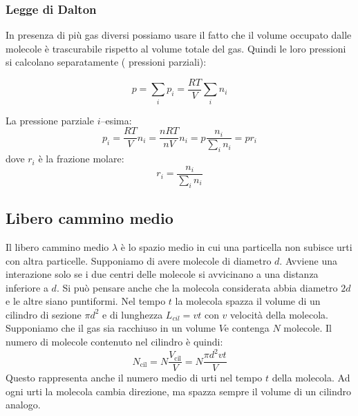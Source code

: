 \subsubsection{Legge di Dalton}
In presenza di più gas diversi possiamo usare il fatto che il volume occupato dalle molecole è trascurabile rispetto al volume totale del gas. Quindi le loro pressioni si calcolano separatamente ( pressioni parziali):
\begin{legge}[Dalton]
   \begin{equation}
      p = \sum_i p_i = \frac{RT}{V}\sum_i{n_i}
   \end{equation}
\end{legge}
La pressione parziale $i$--esima:
\begin{equation}
   p_i = \frac{RT}{V}n_i = \frac{nRT}{nV}n_i = p\frac{n_i}{\sum_i n_i} = pr_i
\end{equation}
dove $r_i$ è la frazione molare:
\begin{equation}
   r_i = \frac{n_i}{\sum_i n_i}
\end{equation}


\subsection{Libero cammino medio}
\label{libero cammino medio fisica1}
Il libero cammino medio $\lambda$ è lo spazio medio in cui una particella non subisce urti con altra particelle. Supponiamo di avere molecole di diametro $d$. Avviene una interazione solo se i due centri delle molecole si avvicinano a una distanza inferiore a $d$. Si può pensare anche che la molecola considerata abbia diametro $2d$ e le altre siano puntiformi. Nel tempo $t$ la molecola spazza il volume di un cilindro di sezione $\pi d^2$ e di lunghezza $L_{cil}=vt$ con $v$ velocità della molecola. Supponiamo che il gas sia racchiuso in un volume $V$e contenga $N$ molecole. Il numero di molecole contenuto nel cilindro è quindi:
\[N_{\text{cil}}=N\frac{V_{\text{cil}}}{V}=N\frac{\pi d^2vt}{V}\]
Questo rappresenta anche il numero medio di urti nel tempo $t$ della molecola. Ad ogni urti la molecola cambia direzione, ma spazza sempre il volume di un cilindro analogo.

